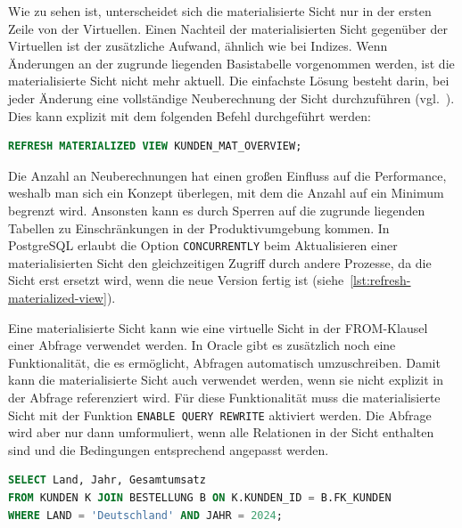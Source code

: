 Wie zu sehen ist, unterscheidet sich die materialisierte Sicht nur in der ersten Zeile von der Virtuellen.
Einen Nachteil der materialisierten Sicht gegenüber der Virtuellen ist der zusätzliche Aufwand, ähnlich wie bei Indizes.
Wenn Änderungen an der zugrunde liegenden Basistabelle vorgenommen werden, ist die materialisierte Sicht nicht mehr aktuell.
Die einfachste Lösung besteht darin, bei jeder Änderung eine vollständige Neuberechnung der Sicht durchzuführen (vgl.\ \cite[S. 608]{silberschatz2011database}).
Dies kann explizit mit dem folgenden Befehl durchgeführt werden:

\vspace{-5pt}
\begin{lstlisting}[language=SQL,caption=Aktualisierung der materialisierten Sicht,label={lst:refresh-materialized-view}]
REFRESH MATERIALIZED VIEW KUNDEN_MAT_OVERVIEW;
\end{lstlisting}
\vspace{-5pt}

Die Anzahl an Neuberechnungen hat einen großen Einfluss auf die Performance, weshalb man sich ein Konzept überlegen, mit dem die Anzahl auf ein Minimum begrenzt wird.
Ansonsten kann es durch Sperren auf die zugrunde liegenden Tabellen zu Einschränkungen in der Produktivumgebung kommen.
In PostgreSQL erlaubt die Option \texttt{CONCURRENTLY} beim Aktualisieren einer materialisierten Sicht den gleichzeitigen Zugriff durch andere Prozesse, da die Sicht erst ersetzt wird, wenn die neue Version fertig ist (siehe~\ref{lst:refresh-materialized-view}).

Eine materialisierte Sicht kann wie eine virtuelle Sicht in der FROM-Klausel einer Abfrage verwendet werden.
In Oracle gibt es zusätzlich noch eine Funktionalität, die es ermöglicht, Abfragen automatisch umzuschreiben.
Damit kann die materialisierte Sicht auch verwendet werden, wenn sie nicht explizit in der Abfrage referenziert wird.
Für diese Funktionalität muss die materialisierte Sicht mit der Funktion \texttt{ENABLE QUERY REWRITE} aktiviert werden.
Die Abfrage wird aber nur dann umformuliert, wenn alle Relationen in der Sicht enthalten sind und die Bedingungen entsprechend angepasst werden.

\vspace{-5pt}
\begin{lstlisting}[language=SQL,caption=Select mit Materialized View,label={lst:select-with-mat-view}]
SELECT Land, Jahr, Gesamtumsatz
FROM KUNDEN K JOIN BESTELLUNG B ON K.KUNDEN_ID = B.FK_KUNDEN
WHERE LAND = 'Deutschland' AND JAHR = 2024;
\end{lstlisting}
\vspace{-5pt}

